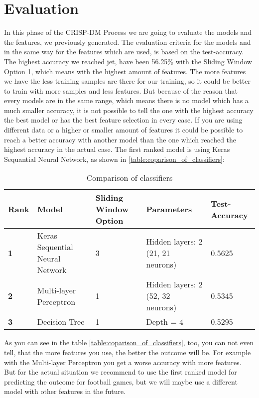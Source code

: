 
\chapter{Evaluation}
In this phase of the CRISP-DM Process we are going to evaluate the models and the features, we previously generated.\newline
The evaluation criteria for the models and in the same way for the features which are used, is based on the test-accuracy. The highest accuracy we reached jet, have been 56.25\% with the Sliding Window Option 1, which means with the highest amount of features. The more features we have the less training samples are there for our training, so it could be better to train with more samples and less features. But because of the reason that every models are in the same range, which means there is no model which has a much smaller accuracy, it is not possible to tell the one with the highest accuracy the best model or has the best feature selection in every case. If you are using different data or a higher or smaller amount of features it could be possible to reach a better accuracy with another model than the one which reached the highest accuracy in the actual case. The first ranked model is using Keras Sequantial Neural Network, as shown in \autoref{table:coparison_of_classifiers}:

\begin{table}[H]
\centering
\begin{tabular}{|p{2.5cm}|p{2.5cm}|p{2.5cm}|p{2.5cm}|p{2.5cm}|}
\hline

\textbf{Rank} & \textbf{Model} & \textbf{Sliding Window Option} & \textbf{Parameters} & \textbf{Test-Accuracy} \\ \hline
\textbf{1} & Keras Sequential Neural Network & 3 & Hidden layers: 2 (21, 21 neurons) & 0.5625 \\ \hline
\textbf{2} & Multi-layer Perceptron & 1 & Hidden layers: 2 (52, 32 neurons) & 0.5345 \\ \hline
\textbf{3} & Decision Tree & 1 & Depth = 4 & 0.5295 \\ \hline

\end{tabular}
\caption{Comparison of classifiers}
\label{table:coparison_of_classifiers}
\end{table}

As you can see in the table \autoref{table:coparison_of_classifiers}, too, you can not even tell, that the more features you use, the better the outcome will be. For example with the Multi-layer Perceptron you get a worse accuracy with more features. But for the actual situation we recommend to use the first ranked model for predicting the outcome for football games, but we will maybe use a different model with other features in the future.